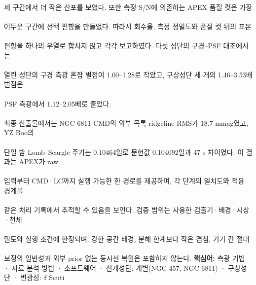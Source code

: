 \paragraph*{}세 구간에서 더 작은 산포를 보였다. 또한 측정 S/N에 의존하는 APEX 품질 컷은 가장
\paragraph*{}어두운 구간에 선택 편향을 만들었다. 따라서 회수율, 측정 정밀도와 품질 컷 뒤의 표본
\paragraph*{}편향을 하나의 우열로 합치지 않고 각각 보고하였다. 다섯 성단의 구경–PSF 대조에서는
\paragraph*{}열린 성단의 구경 측광 혼잡 벌점이 1.00–1.28로 작았고, 구상성단 세 개의 1.46–3.53배 벌점은
\paragraph*{}PSF 측광에서 1.12–2.05배로 줄었다.
\paragraph*{}최종 산출물에서는 NGC 6811 CMD의 외부 목록 ridgeline RMS가 18.7 mmag였고, YZ Boo의
\paragraph*{}단일 밤 Lomb–Scargle 주기는 0.10464일로 문헌값 0.104092일과 47 s 차이였다. 이 결과는 APEX가 raw
\paragraph*{}입력부터 CMD·LC까지 실행 가능한 한 경로를 제공하며, 각 단계의 일치도와 적용 경계를
\paragraph*{}같은 처리 기록에서 추적할 수 있음을 보인다. 검증 범위는 사용한 검출기·배경·시상·천체
\paragraph*{}밀도와 실행 조건에 한정되며, 강한 공간 배경, 분해 한계보다 작은 겹침, 기기 간 절대
\paragraph*{}보정의 일반성과 외부 prior 없는 등시선 복원은 포함하지 않는다.
\medskip
\textbf{핵심어:} 측광 기법 · 자료 분석 방법 · 소프트웨어 · 산개성단: 개별(NGC 457, NGC 6811) · 구상성단 · 변광성: $\delta$ Scuti